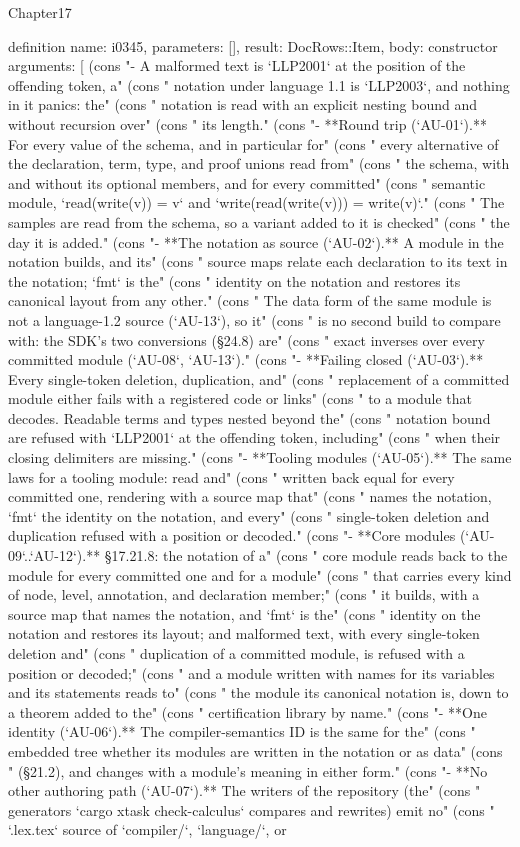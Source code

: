 \begin{lexlean}{Chapter17}
\begin{semanticmodule}
definition{
  name: i0345,
  parameters: [],
  result: DocRows::Item,
  body: constructor{
    arguments: [
      (cons "- A malformed text is `LLP2001` at the position of the offending token, a" (cons "  notation under language 1.1 is `LLP2003`, and nothing in it panics: the" (cons "  notation is read with an explicit nesting bound and without recursion over" (cons "  its length." (cons "- **Round trip (`AU-01`).** For every value of the schema, and in particular for" (cons "  every alternative of the declaration, term, type, and proof unions read from" (cons "  the schema, with and without its optional members, and for every committed" (cons "  semantic module, `read(write(v)) = v` and `write(read(write(v))) = write(v)`." (cons "  The samples are read from the schema, so a variant added to it is checked" (cons "  the day it is added." (cons "- **The notation as source (`AU-02`).** A module in the notation builds, and its" (cons "  source maps relate each declaration to its text in the notation; `fmt` is the" (cons "  identity on the notation and restores its canonical layout from any other." (cons "  The data form of the same module is not a language-1.2 source (`AU-13`), so it" (cons "  is no second build to compare with: the SDK's two conversions (§24.8) are" (cons "  exact inverses over every committed module (`AU-08`, `AU-13`)." (cons "- **Failing closed (`AU-03`).** Every single-token deletion, duplication, and" (cons "  replacement of a committed module either fails with a registered code or links" (cons "  to a module that decodes. Readable terms and types nested beyond the" (cons "  notation bound are refused with `LLP2001` at the offending token, including" (cons "  when their closing delimiters are missing." (cons "- **Tooling modules (`AU-05`).** The same laws for a tooling module: read and" (cons "  written back equal for every committed one, rendering with a source map that" (cons "  names the notation, `fmt` the identity on the notation, and every" (cons "  single-token deletion and duplication refused with a position or decoded." (cons "- **Core modules (`AU-09`..`AU-12`).** §17.21.8: the notation of a" (cons "  core module reads back to the module for every committed one and for a module" (cons "  that carries every kind of node, level, annotation, and declaration member;" (cons "  it builds, with a source map that names the notation, and `fmt` is the" (cons "  identity on the notation and restores its layout; and malformed text, with every single-token deletion and" (cons "  duplication of a committed module, is refused with a position or decoded;" (cons "  and a module written with names for its variables and its statements reads to" (cons "  the module its canonical notation is, down to a theorem added to the" (cons "  certification library by name." (cons "- **One identity (`AU-06`).** The compiler-semantics ID is the same for the" (cons "  embedded tree whether its modules are written in the notation or as data" (cons "  (§21.2), and changes with a module's meaning in either form." (cons "- **No other authoring path (`AU-07`).** The writers of the repository (the" (cons "  generators `cargo xtask check-calculus` compares and rewrites) emit no" (cons "  `.lex.tex` source of `compiler/`, `language/`, or }}
\end{semanticmodule}
\end{lexlean}
